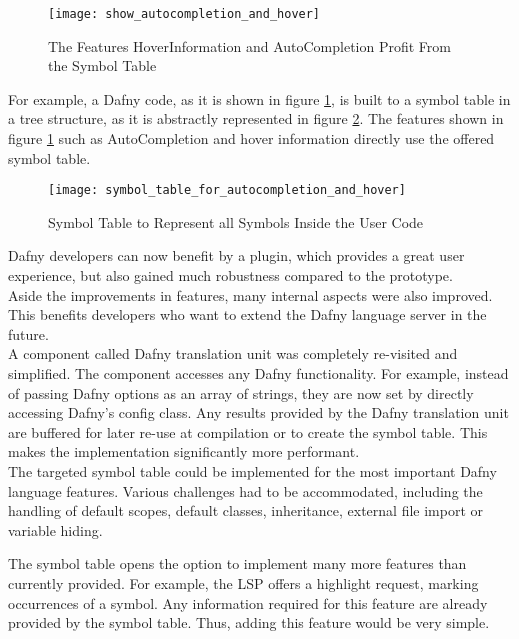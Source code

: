 \begin{figure}[H]
    \centering
    \texttt{[image: show\_autocompletion\_and\_hover]}
    \caption{The Features HoverInformation and AutoCompletion Profit From the Symbol Table}
    \label{fig:show_autocompletion_and_hover}
\end{figure}

For example, a Dafny code, as it is shown in figure \ref{fig:show_autocompletion_and_hover},
is built to a symbol table in a tree structure, as it is abstractly represented in figure \ref{fig:symbol_table_for_autocompletion_and_hover}.
The features shown in figure \ref{fig:show_autocompletion_and_hover} such as AutoCompletion and hover information directly use the offered symbol table.

\begin{figure}[H]
    \centering
    \texttt{[image: symbol\_table\_for\_autocompletion\_and\_hover]}
    \caption{Symbol Table to Represent all Symbols Inside the User Code}
    \label{fig:symbol_table_for_autocompletion_and_hover}
\end{figure}

Dafny developers can now benefit by a plugin, which provides a great user experience, but also gained much robustness compared to the prototype.\\

Aside the improvements in features, many internal aspects were also improved.
This benefits developers who want to extend the Dafny language server in the future.\\

A component called Dafny translation unit was completely re-visited and simplified.
The component accesses any Dafny functionality.
For example, instead of passing Dafny options as an array of strings, they are now set by
directly accessing Dafny's config class.
Any results provided by the Dafny translation unit are buffered for later re-use at compilation or to create the symbol table.
This makes the implementation significantly more performant.\\

The targeted symbol table could be implemented for the most important Dafny language features.
Various challenges had to be accommodated, including the handling of default scopes, default classes, inheritance, external file import or variable hiding.

The symbol table opens the option to implement many more features than currently provided.
For example, the LSP offers a highlight request, marking occurrences of a symbol.
Any information required for this feature are already provided by the symbol table.
Thus, adding this feature would be very simple.

